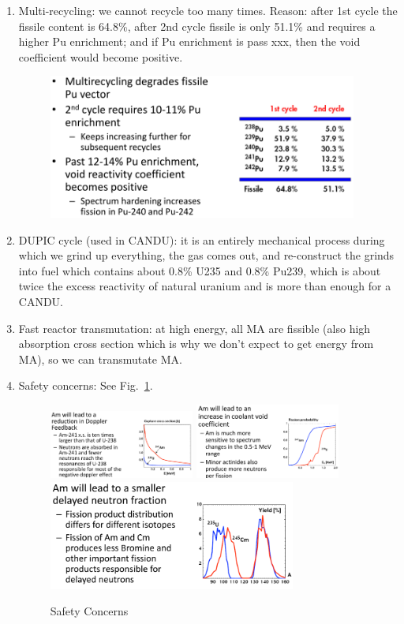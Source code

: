 \documentclass{school-22.211-notes}
\begin{document}
\begin{enumerate}
\item Multi-recycling: we cannot recycle too many times. Reason: after 1st cycle the fissile content is 64.8\%, after 2nd cycle fissile is only 51.1\% and requires a higher Pu enrichment; and if Pu enrichment is pass xxx, then the void coefficient would become positive. 
  \begin{figure}[h]
    \centering
    \includegraphics[width=4in]{images/dfs/multirecycling.png}
  \end{figure}

\item DUPIC cycle (used in CANDU): it is an entirely mechanical process during which we grind up everything, the gas comes out, and re-construct the grinds into fuel which contains about 0.8\% U235 and 0.8\% Pu239, which is about twice the excess reactivity of natural uranium and is more than enough for a CANDU.

\item Fast reactor transmutation: at high energy, all MA are fissible (also high absorption cross section which is why we don't expect to get energy from MA), so we can transmutate MA.  

\item Safety concerns: See Fig.~\ref{safety-concern}. 
 
  \begin{figure}[h]
    \centering
    \includegraphics[width=0.45\textwidth]{images/dfs/safety-Doppler.png}
    \includegraphics[width=0.45\textwidth]{images/dfs/safety-void.png}
    \includegraphics[width=3.2in]{images/dfs/safety-delayed-neutrons.png}
    \caption{Safety Concerns} \label{safety-concern}
  \end{figure}
\end{enumerate}
\end{document}

